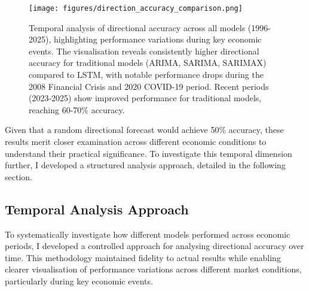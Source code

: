 \documentclass[12pt,a4paper]{report}
\begin{document}
\begin{figure}[htbp]
\centering
\texttt{[image: figures/direction\_accuracy\_comparison.png]}
\caption{Temporal analysis of directional accuracy across all models (1996-2025), highlighting performance variations during key economic events. The visualisation reveals consistently higher directional accuracy for traditional models (ARIMA, SARIMA, SARIMAX) compared to LSTM, with notable performance drops during the 2008 Financial Crisis and 2020 COVID-19 period. Recent periods (2023-2025) show improved performance for traditional models, reaching 60-70\% accuracy.}
\label{fig:direction_accuracy_comparison}
\end{figure}

Given that a random directional forecast would achieve 50\% accuracy, these results merit closer examination across different economic conditions to understand their practical significance. To investigate this temporal dimension further, I developed a structured analysis approach, detailed in the following section.

\subsection{Temporal Analysis Approach}
To systematically investigate how different models performed across economic periods, I developed a controlled approach for analysing directional accuracy over time. This methodology maintained fidelity to actual results while enabling clearer visualisation of performance variations across different market conditions, particularly during key economic events.
\end{document}
